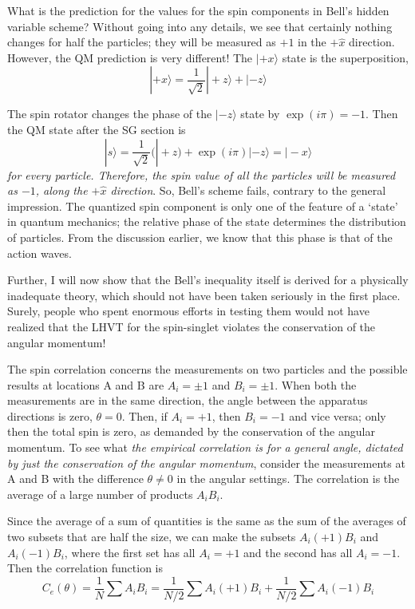 What is the prediction for the values for the spin components in Bell's hidden variable
scheme? Without going into any details, we see that certainly nothing changes for half the
particles; they will be measured as $+1$ in the $+ \hat{x}$ direction. However, the QM prediction is
very different! The $|+x \rangle$ state is the superposition,
\begin{equation*}
| + x \rangle = \frac{1}{\sqrt{2}} | + z\rangle + | - z \rangle \tag{39}\label{c14-eq39}
\end{equation*}

The spin rotator changes the phase of the $|-z \rangle$ state by $\exp(i \pi) = -1$. Then the QM state after 
the SG section is
\begin{equation*}
|s \rangle = \frac{1}{\sqrt{2}} (|+z) + \exp (i \pi) | - z \rangle = | - x \rangle \tag{40}\label{c14-eq40}
\end{equation*}
\textit{for every particle. Therefore, the spin value of all the particles will be measured as $-1$, along
the $+ \hat{x}$ direction}. So, Bell's scheme fails, contrary to the general impression. The quantized
spin component is only one of the feature of a `state' in quantum mechanics; the relative phase of
the state determines the distribution of particles. From the discussion earlier, we know that
this phase is that of the action waves.

Further, I will now show that the Bell's inequality itself is derived for a physically inadequate theory, which should not have been taken seriously in the first place. Surely, people who spent enormous efforts in testing them would not have realized that the LHVT for the
spin-singlet violates the conservation of the angular momentum!

The spin correlation concerns the measurements on two particles and the possible results
at locations A and B are $A_i = \pm 1$ and $B_i = \pm 1$. When both the measurements are in the
same direction, the angle between the apparatus directions is zero, $\theta = 0$. Then, if $A_i = +1$, then
$B_i = -1$ and vice versa; only then the total spin is zero, as demanded by the conservation
of the angular momentum. To see what \textit{the empirical correlation is for a general angle,
dictated by just the conservation of the angular momentum}, consider the measurements at
A and B with the difference $\theta \neq 0$ in the angular settings. The correlation is the average of
a large number of products $A_i B_i$.

Since the average of a sum of quantities is the same as the sum of the averages of two
subsets that are half the size, we can make the subsets $A_i (+1)B_i$ and $A_i (-1)B_i$, where the
first set has all $A_i = +1$ and the second has all $A_i = -1$. Then the correlation function is
\begin{equation*}
C_e (\theta) = \frac{1}{N} \sum A_i B_i = \frac{1}{N/2} \sum A_i (+1) B_i + \frac{1}{N/2} \sum A_i (-1) B_i\tag{41}\label{c14-eq41}
\end{equation*}

